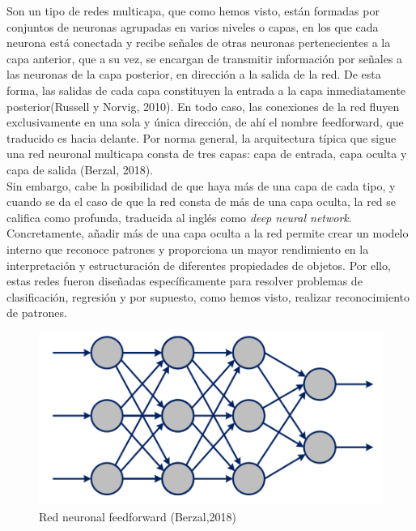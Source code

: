 Son un tipo de redes multicapa, que como hemos visto, están formadas por conjuntos de neuronas agrupadas en varios niveles o capas, en los que cada neurona está conectada y recibe señales de otras neuronas pertenecientes a la capa anterior, que a su vez, se encargan de transmitir información por señales a las neuronas de la capa posterior, en dirección a la salida de la red. De esta forma, las salidas de cada capa constituyen la entrada a la capa inmediatamente posterior(Russell y Norvig, 2010). En todo caso, las conexiones de la red fluyen exclusivamente en una sola y única dirección, de ahí el nombre feedforward, que traducido es hacia delante. Por norma general, la arquitectura típica que sigue una red neuronal multicapa consta de tres capas: capa de entrada, capa oculta y capa de salida (Berzal, 2018). \\

Sin embargo, cabe la posibilidad de que haya más de una capa de cada tipo, y cuando se da el caso de que la red consta de más de una capa oculta, la red se califica como profunda, traducida al inglés como \textit{deep neural network}. Concretamente, añadir más de una capa oculta a la red permite crear un modelo interno que reconoce patrones y proporciona un mayor rendimiento en la interpretación y estructuración de diferentes propiedades de objetos. Por ello, estas redes fueron diseñadas específicamente para resolver problemas de clasificación, regresión y por supuesto, como hemos visto, realizar reconocimiento de patrones.\\

\begin{figure}[h]
	\centering
	\includegraphics[width = 1 \textwidth]{Imagenes/Vectorial/feedforward.png}
	\caption{Red neuronal feedforward (Berzal,2018)}
	\label{fig:feedforward}
\end{figure}



